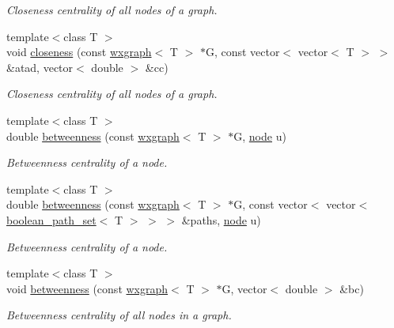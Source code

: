 \begin{DoxyCompactItemize}
\begin{DoxyCompactList}\small\item\em Closeness centrality of all nodes of a graph. \end{DoxyCompactList}\item 
{\footnotesize template$<$class T $>$ }\\void \hyperlink{namespacelgraph_1_1networks_1_1metrics_1_1centralities_af807c15c31f07d267798cc959fc61dca}{closeness} (const \hyperlink{classlgraph_1_1utils_1_1wxgraph}{wxgraph}$<$ T $>$ $\ast$G, const vector$<$ vector$<$ T $>$ $>$ \&atad, vector$<$ double $>$ \&cc)
\begin{DoxyCompactList}\small\item\em Closeness centrality of all nodes of a graph. \end{DoxyCompactList}\item 
{\footnotesize template$<$class T $>$ }\\double \hyperlink{namespacelgraph_1_1networks_1_1metrics_1_1centralities_a5a8a94d9361a49ffa657d8d6541be4be}{betweenness} (const \hyperlink{classlgraph_1_1utils_1_1wxgraph}{wxgraph}$<$ T $>$ $\ast$G, \hyperlink{namespacelgraph_1_1utils_a7bd66ede3805ef121bc2835bd48de0cf}{node} u)
\begin{DoxyCompactList}\small\item\em Betweenness centrality of a node. \end{DoxyCompactList}\item 
{\footnotesize template$<$class T $>$ }\\double \hyperlink{namespacelgraph_1_1networks_1_1metrics_1_1centralities_a04383a2788cd6a602e390b08f06099a3}{betweenness} (const \hyperlink{classlgraph_1_1utils_1_1wxgraph}{wxgraph}$<$ T $>$ $\ast$G, const vector$<$ vector$<$ \hyperlink{namespacelgraph_1_1utils_aaf50131e15d771a45620336d6e7a77f8}{boolean\+\_\+path\+\_\+set}$<$ T $>$ $>$ $>$ \&paths, \hyperlink{namespacelgraph_1_1utils_a7bd66ede3805ef121bc2835bd48de0cf}{node} u)
\begin{DoxyCompactList}\small\item\em Betweenness centrality of a node. \end{DoxyCompactList}\item 
{\footnotesize template$<$class T $>$ }\\void \hyperlink{namespacelgraph_1_1networks_1_1metrics_1_1centralities_a32fb8a20727fbc27a7226361bfd5aee2}{betweenness} (const \hyperlink{classlgraph_1_1utils_1_1wxgraph}{wxgraph}$<$ T $>$ $\ast$G, vector$<$ double $>$ \&bc)
\begin{DoxyCompactList}\small\item\em Betweenness centrality of all nodes in a graph. \end{DoxyCompactList}\item 

\end{DoxyCompactItemize}
